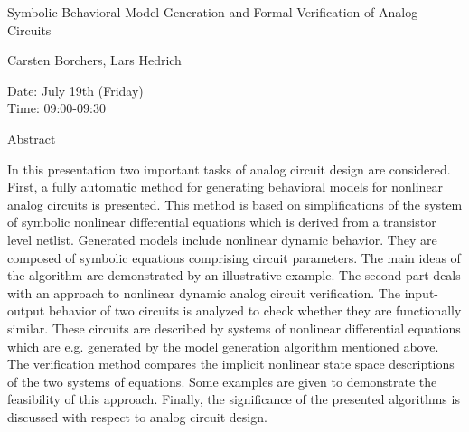 \begin{center}
\LARGE
Symbolic Behavioral Model Generation and Formal Verification of Analog Circuits
\end{center}

\begin{center}
\Large
Carsten Borchers, Lars Hedrich
\end{center}

\noindent
Date:  July 19th (Friday)\\
Time: 09:00-09:30\\

\begin{center}
\large
Abstract
\end{center}

In this presentation two important tasks of analog circuit design are considered. First, a fully
automatic method for generating behavioral models for nonlinear analog circuits is presented. This
method is based on simplifications of the system of symbolic nonlinear differential equations
which is derived from a transistor level netlist. Generated models include nonlinear dynamic
behavior. They are composed of symbolic equations comprising circuit parameters. The main ideas
of the algorithm are demonstrated by an illustrative example. The second part deals with an
approach to nonlinear dynamic analog circuit verification. The input-output behavior of two
circuits is analyzed to check whether they are functionally similar. These circuits are described by
systems of nonlinear differential equations which are e.g. generated by the model generation
algorithm mentioned above. The verification method compares the implicit nonlinear state space
descriptions of the two systems of equations. Some examples are given to demonstrate the
feasibility of this approach. Finally, the significance of the presented algorithms is discussed with
respect to analog circuit design. 

